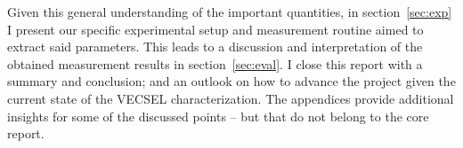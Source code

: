 Given this general understanding
of the important quantities,
in section~\ref{sec:exp}
I present our
specific experimental setup
and measurement routine
aimed to extract said parameters.
This leads to a discussion
and interpretation
of the obtained measurement results
in section~\ref{sec:eval}.
I close this report
with a summary
and conclusion;
and an outlook on
how to advance the project
given the current state
of the VECSEL characterization.
The appendices
provide additional insights
for some of the discussed points --
but that do not belong to
the core report.
